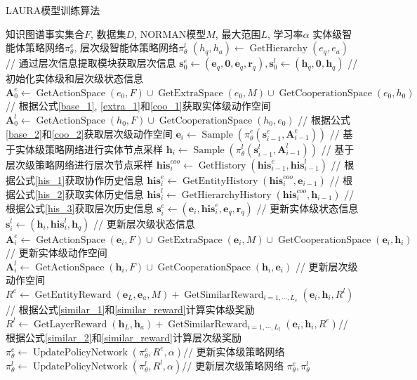 \documentclass[algorithmlist, AutoFakeBold, AutoFakeSlant, figurelist, tablelist, nomlist, engineering]{seuthesix}
\begin{document}
\begin{algorithm}[H]
	\caption{LAURA模型训练算法}  
	\label{algorithm_dualagent}
	\begin{algorithmic}[1]
  \Require 知识图谱事实集合$F$, 数据集$D$, NORMAN模型$M$, 最大范围$L$, 学习率$\alpha$
  \Ensure 实体级智能体策略网络$\pi_\theta^e$, 层次级智能体策略网络$\pi_\theta^l$
  \State $(h_q, h_a) \leftarrow \operatorname{GetHierarchy}(e_q, e_a)$ // 通过层次信息提取模块获取层次信息
  \State $\bm{s}_{0}^{e} \leftarrow (\bm{e}_q, \bm{0}, \bm{e}_q, \bm{r}_q), \bm{s}_{0}^{l} \leftarrow (\bm{h}_q, \bm{0}, \bm{h}_q)$ // 初始化实体级和层次级状态信息
  \State $\bm{A}_{0}^{e} \leftarrow \operatorname{GetActionSpace}(e_0, F) \cup \operatorname{GetExtraSpace}(e_0, M) \cup \operatorname{GetCooperationSpace}(e_0, h_0)$ // 根据公式\ref{base_1}, \ref{extra_1}和\ref{coo_1}获取实体级动作空间
  \State $\bm{A}_{0}^{l} \leftarrow \operatorname{GetActionSpace}(h_0, F) \cup \operatorname{GetCooperationSpace}(h_0, e_0)$ // 根据公式\ref{base_2}和\ref{coo_2}获取层次级动作空间
  \State $\bm{e}_i \leftarrow \operatorname{Sample}(\pi_\theta^e(\bm{s}_{i-1}^{e}, \bm{A}_{i-1}^{e}))$ // 基于实体级策略网络进行实体节点采样
  \State $\bm{h}_i \leftarrow \operatorname{Sample}(\pi_\theta^l(\bm{s}_{i-1}^{l}, \bm{A}_{i-1}^{l}))$ // 基于层次级策略网络进行层次节点采样
  \State $\bm{his}_{i}^{coo} \leftarrow \operatorname{GetHistory}(\bm{his}_{i-1}^{e}, \bm{his}_{i-1}^{l})$ // 根据公式\ref{his_1}获取协作历史信息
  \State $\bm{his}_{i}^{e} \leftarrow \operatorname{GetEntityHistory}(\bm{his}_{i}^{coo}, \bm{e}_{i-1})$ // 根据公式\ref{his_2}获取实体历史信息
  \State $\bm{his}_{i}^{l} \leftarrow \operatorname{GetHierarchyHistory}(\bm{his}_{i}^{coo}, \bm{h}_{i-1})$ // 根据公式\ref{his_3}获取层次历史信息
  \State $\bm{s}_{i}^{e} \leftarrow (\bm{e}_{i}, \bm{his}_{i}^{e}, \bm{e}_q, \bm{r}_q)$ // 更新实体级状态信息
  \State $\bm{s}_{i}^{l} \leftarrow (\bm{h}_{i}, \bm{his}_{i}^{l}, \bm{h}_q)$ // 更新层次级状态信息
  \State $\bm{A}_{i}^{e} \leftarrow \operatorname{GetActionSpace}(\bm{e}_i, F) \cup \operatorname{GetExtraSpace}(\bm{e}_i, M) \cup \operatorname{GetCooperationSpace}(\bm{e}_i, \bm{h}_i)$ // 更新实体级动作空间
  \State $\bm{A}_{i}^{l} \leftarrow \operatorname{GetActionSpace}(\bm{h}_i, F) \cup \operatorname{GetCooperationSpace}(\bm{h}_i, \bm{e}_i)$ // 更新层次级动作空间
  \EndFor
  \State $R^{e} \leftarrow \operatorname{GetEntityReward}(\bm{e}_L, \bm{e}_a, M) + \operatorname{GetSimilarReward}_{i=1,\cdots,L_e}(\bm{e}_i, \bm{h}_i, R^{l})$// 根据公式\ref{similar_1}和\ref{similar_reward}计算实体级奖励
  \State $R^{l} \leftarrow \operatorname{GetLayerReward}(\bm{h}_L, \bm{h}_a) + \operatorname{GetSimilarReward}_{i=1,\cdots,L_l}(\bm{e}_i, \bm{h}_i, R^{e})$// 根据公式\ref{similar_2}和\ref{similar_reward}计算层次级奖励
  \State $\pi_\theta^e \leftarrow \operatorname{UpdatePolicyNetwork}(\pi_\theta^e, R^{e}, \alpha)$// 更新实体级策略网络
  \State $\pi_\theta^l \leftarrow \operatorname{UpdatePolicyNetwork}(\pi_\theta^l, R^{l}, \alpha)$// 更新层次级策略网络
  \EndFor
  \State \Return $\pi_\theta^e, \pi_\theta^l$
	\end{algorithmic}
\end{algorithm} 
\end{document}
